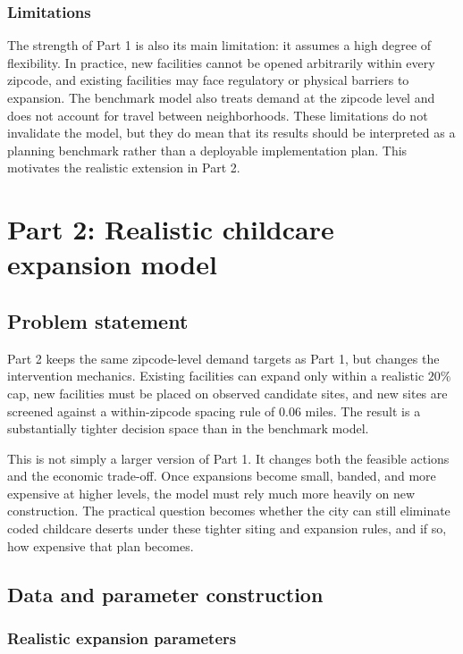\documentclass[11pt]{article}
\newcommand{\1}{\mathbb{I}}
\begin{document}
\subsubsection{Limitations}

The strength of Part 1 is also its main limitation: it assumes a high degree of flexibility. In practice, new facilities cannot be opened arbitrarily within every zipcode, and existing facilities may face regulatory or physical barriers to expansion. The benchmark model also treats demand at the zipcode level and does not account for travel between neighborhoods. These limitations do not invalidate the model, but they do mean that its results should be interpreted as a planning benchmark rather than a deployable implementation plan. This motivates the realistic extension in Part 2.

\section{Part 2: Realistic childcare expansion model}

\subsection{Problem statement}

Part 2 keeps the same zipcode-level demand targets as Part 1, but changes the intervention mechanics. Existing facilities can expand only within a realistic \(20\%\) cap, new facilities must be placed on observed candidate sites, and new sites are screened against a within-zipcode spacing rule of \(0.06\) miles. The result is a substantially tighter decision space than in the benchmark model.

This is not simply a larger version of Part 1. It changes both the feasible actions and the economic trade-off. Once expansions become small, banded, and more expensive at higher levels, the model must rely much more heavily on new construction. The practical question becomes whether the city can still eliminate coded childcare deserts under these tighter siting and expansion rules, and if so, how expensive that plan becomes.

\subsection{Data and parameter construction}

\subsubsection{Realistic expansion parameters}
\end{document}
